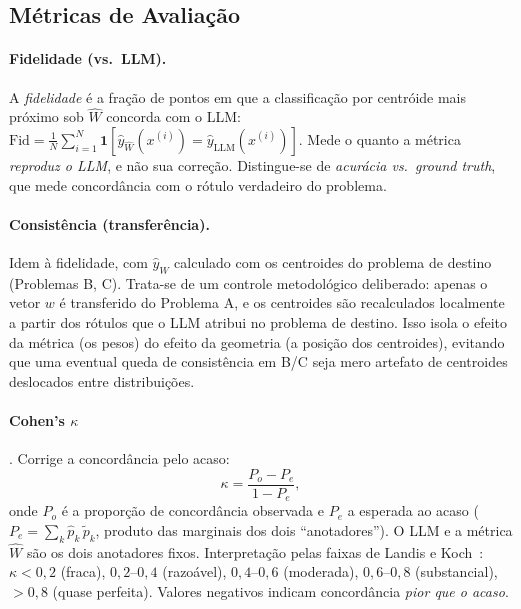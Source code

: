 \documentclass[12pt,a4paper]{article}
\newcommand{\West}{\ensuremath{\hat{W}}}   %
\begin{document}
\subsection{Métricas de Avaliação}
\label{sec:metricas}

\paragraph{Fidelidade (vs.\ LLM).}
A \emph{fidelidade} é a fração de pontos em que a classificação por centróide mais próximo sob
\West{} concorda com o LLM: $\text{Fid} = \frac{1}{N}\sum_{i=1}^N
\mathbf{1}[\hat{y}_{\West}(x^{(i)}) = \hat{y}_{\text{LLM}}(x^{(i)})]$. Mede o quanto a
métrica \emph{reproduz o LLM}, e não sua correção. Distingue-se de \emph{acurácia vs.\
ground truth}, que mede concordância com o rótulo verdadeiro do problema.

\paragraph{Consistência (transferência).}
Idem à fidelidade, com $\hat{y}_{\West}$ calculado com os centroides do problema de destino
(Problemas B, C). Trata-se de um controle metodológico deliberado: apenas o vetor $w$ é
transferido do Problema A, e os centroides são recalculados localmente a partir dos rótulos
que o LLM atribui no problema de destino. Isso isola o efeito da métrica (os pesos) do
efeito da geometria (a posição dos centroides), evitando que uma eventual queda de
consistência em B/C seja mero artefato de centroides deslocados entre distribuições.

\paragraph{Cohen's $\kappa$} \cite{artsteinInterCoder2008}. Corrige a concordância pelo
acaso:
\begin{equation}
  \kappa = \frac{P_o - P_e}{1 - P_e},
\end{equation}
onde $P_o$ é a proporção de concordância observada e $P_e$ a esperada ao acaso
($P_e = \sum_k \hat{p}_k\,\tilde{p}_k$, produto das marginais dos dois ``anotadores''). O
LLM e a métrica \West{} são os dois anotadores fixos. Interpretação pelas faixas de Landis e
Koch~\cite{landisKoch1977}: $\kappa<0{,}2$ (fraca),
$0{,}2$–$0{,}4$ (razoável), $0{,}4$–$0{,}6$ (moderada), $0{,}6$–$0{,}8$ (substancial),
$>0{,}8$ (quase perfeita). Valores negativos indicam concordância \emph{pior que o acaso}.
\end{document}
